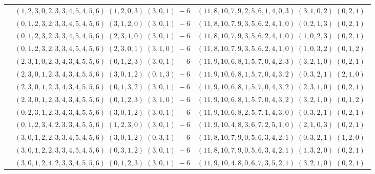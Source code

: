 \documentclass[11pt]{article}
\begin{document}
\begin{longtable}[l]{|c|c|c|}
 \cline{2-3} 
 & $(1 ,2 ,3 ,0 ,2 ,3 ,3 ,4 ,5 ,4 ,5 ,6) \;(1 ,2 ,0 ,3) \;(3 ,0 ,1) \;-6$ & $(11 ,8 ,10 ,7 ,9 ,2 ,5 ,6 ,1 ,4 ,0 ,3) \;(3 ,1 ,0 ,2) \;(0 ,2 ,1) \;$\\ 
 \cline{2-3} 
 & $(0 ,1 ,2 ,3 ,2 ,3 ,3 ,4 ,5 ,4 ,5 ,6) \;(3 ,1 ,2 ,0) \;(3 ,0 ,1) \;-6$ & $(11 ,8 ,10 ,7 ,9 ,3 ,5 ,6 ,2 ,4 ,1 ,0) \;(0 ,2 ,1 ,3) \;(0 ,2 ,1) \;$\\ 
 \cline{2-3} 
 & $(0 ,1 ,2 ,3 ,2 ,3 ,3 ,4 ,5 ,4 ,5 ,6) \;(2 ,3 ,1 ,0) \;(3 ,0 ,1) \;-6$ & $(11 ,8 ,10 ,7 ,9 ,3 ,5 ,6 ,2 ,4 ,1 ,0) \;(1 ,0 ,2 ,3) \;(0 ,2 ,1) \;$\\ 
 \cline{2-3} 
 & $(0 ,1 ,2 ,3 ,2 ,3 ,3 ,4 ,5 ,4 ,5 ,6) \;(2 ,3 ,0 ,1) \;(3 ,1 ,0) \;-6$ & $(11 ,8 ,10 ,7 ,9 ,3 ,5 ,6 ,2 ,4 ,1 ,0) \;(1 ,0 ,3 ,2) \;(0 ,1 ,2) \;$\\ 
 \cline{2-3} 
 & $(2 ,3 ,1 ,0 ,2 ,3 ,4 ,3 ,4 ,5 ,5 ,6) \;(0 ,1 ,2 ,3) \;(3 ,0 ,1) \;-6$ & $(11 ,9 ,10 ,6 ,8 ,1 ,5 ,7 ,0 ,4 ,2 ,3) \;(3 ,2 ,1 ,0) \;(0 ,2 ,1) \;$\\ 
 \cline{2-3} 
 & $(2 ,3 ,0 ,1 ,2 ,3 ,4 ,3 ,4 ,5 ,5 ,6) \;(3 ,0 ,1 ,2) \;(0 ,1 ,3) \;-6$ & $(11 ,9 ,10 ,6 ,8 ,1 ,5 ,7 ,0 ,4 ,3 ,2) \;(0 ,3 ,2 ,1) \;(2 ,1 ,0) \;$\\ 
 \cline{2-3} 
 & $(2 ,3 ,0 ,1 ,2 ,3 ,4 ,3 ,4 ,5 ,5 ,6) \;(0 ,1 ,3 ,2) \;(3 ,0 ,1) \;-6$ & $(11 ,9 ,10 ,6 ,8 ,1 ,5 ,7 ,0 ,4 ,3 ,2) \;(2 ,3 ,1 ,0) \;(0 ,2 ,1) \;$\\ 
 \cline{2-3} 
 & $(2 ,3 ,0 ,1 ,2 ,3 ,4 ,3 ,4 ,5 ,5 ,6) \;(0 ,1 ,2 ,3) \;(3 ,1 ,0) \;-6$ & $(11 ,9 ,10 ,6 ,8 ,1 ,5 ,7 ,0 ,4 ,3 ,2) \;(3 ,2 ,1 ,0) \;(0 ,1 ,2) \;$\\ 
 \cline{2-3} 
 & $(0 ,2 ,3 ,1 ,2 ,3 ,4 ,3 ,4 ,5 ,5 ,6) \;(3 ,0 ,1 ,2) \;(3 ,0 ,1) \;-6$ & $(11 ,9 ,10 ,6 ,8 ,2 ,5 ,7 ,1 ,4 ,3 ,0) \;(0 ,3 ,2 ,1) \;(0 ,2 ,1) \;$\\ 
 \cline{2-3} 
 & $(0 ,1 ,2 ,3 ,4 ,2 ,3 ,3 ,4 ,5 ,5 ,6) \;(1 ,2 ,3 ,0) \;(3 ,0 ,1) \;-6$ & $(11 ,9 ,10 ,4 ,8 ,3 ,6 ,7 ,2 ,5 ,1 ,0) \;(2 ,1 ,0 ,3) \;(0 ,2 ,1) \;$\\ 
 \cline{2-3} 
 & $(3 ,0 ,1 ,2 ,2 ,3 ,3 ,4 ,5 ,4 ,5 ,6) \;(3 ,0 ,1 ,2) \;(0 ,3 ,1) \;-6$ & $(11 ,8 ,10 ,7 ,9 ,0 ,5 ,6 ,3 ,4 ,2 ,1) \;(0 ,3 ,2 ,1) \;(1 ,2 ,0) \;$\\ 
 \cline{2-3} 
 & $(3 ,0 ,1 ,2 ,2 ,3 ,3 ,4 ,5 ,4 ,5 ,6) \;(0 ,3 ,1 ,2) \;(3 ,0 ,1) \;-6$ & $(11 ,8 ,10 ,7 ,9 ,0 ,5 ,6 ,3 ,4 ,2 ,1) \;(1 ,3 ,2 ,0) \;(0 ,2 ,1) \;$\\ 
 \cline{2-3} 
 & $(3 ,0 ,1 ,2 ,4 ,2 ,3 ,3 ,4 ,5 ,5 ,6) \;(0 ,1 ,2 ,3) \;(3 ,0 ,1) \;-6$ & $(11 ,9 ,10 ,4 ,8 ,0 ,6 ,7 ,3 ,5 ,2 ,1) \;(3 ,2 ,1 ,0) \;(0 ,2 ,1) \;$\\ 

\end{longtable}
\end{document}
